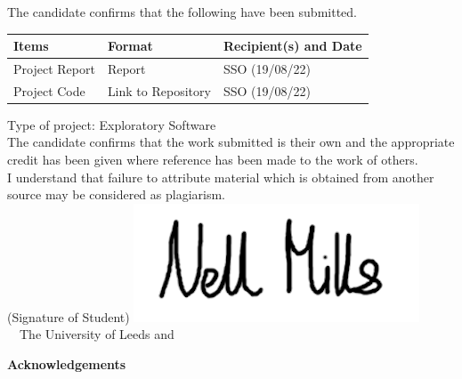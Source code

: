 \frontcover

\clearpage
\noindent The candidate confirms that the following have been submitted.\\
\begin{table}[ht!]
\begin{tabular}{|p{}|p{}|p{}|}
\hline 
Items & Format & Recipient(s) and Date \\ 
\hline 
Project Report & Report & SSO (19/08/22) \\ 
\hline 
Project Code & Link to Repository & SSO (19/08/22) \\ 
\hline
\end{tabular} 
\end{table}

\noindent Type of project: Exploratory Software
\vspace{\fill}\\
\noindent The candidate confirms that the work submitted is their own and the appropriate credit has been given where reference has been made to the work of others.
\vspace{\fill}\\
\noindent I understand that failure to attribute material which is obtained from another source may be considered as plagiarism.
\vspace{\fill}\\
\flushright(Signature of Student) \includegraphics{Images/Signature.png}
\flushleft
\vspace{\fill}
\textcopyright~\session~The University of Leeds and~\fullname

\begin{dissertationsummary}

\end{dissertationsummary}

\clearpage
\centering\textbf{Acknowledgements}
\flushleft


\tableofcontents

\clearpage
\listoffigures
\listoftables


